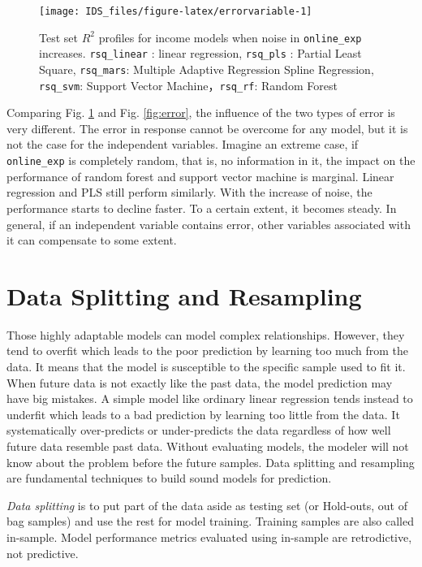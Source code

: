 \documentclass[12pt,]{krantz}
\theoremstyle{definition}
\theoremstyle{definition}
\theoremstyle{remark}
\begin{document}
\begin{figure}

{\centering \texttt{[image: IDS\_files/figure-latex/errorvariable-1]} 

}

\caption{Test set \(R^2\) profiles for income models when
noise in \texttt{online\_exp} increases. \texttt{rsq\_linear} : linear
regression, \texttt{rsq\_pls} : Partial Least Square,
\texttt{rsq\_mars}: Multiple Adaptive Regression Spline Regression,
\texttt{rsq\_svm}: Support Vector Machine，\texttt{rsq\_rf}: Random
Forest}\label{fig:errorvariable}
\end{figure}

Comparing Fig. \ref{fig:errorvariable} and Fig. \ref{fig:error}, the
influence of the two types of error is very different. The error in
response cannot be overcome for any model, but it is not the case for
the independent variables. Imagine an extreme case, if
\texttt{online\_exp} is completely random, that is, no information in
it, the impact on the performance of random forest and support vector
machine is marginal. Linear regression and PLS still perform similarly.
With the increase of noise, the performance starts to decline faster. To
a certain extent, it becomes steady. In general, if an independent
variable contains error, other variables associated with it can
compensate to some extent.

\section{Data Splitting and
Resampling}\label{data-splitting-and-resampling}

Those highly adaptable models can model complex relationships. However,
they tend to overfit which leads to the poor prediction by learning too
much from the data. It means that the model is susceptible to the
specific sample used to fit it. When future data is not exactly like the
past data, the model prediction may have big mistakes. A simple model
like ordinary linear regression tends instead to underfit which leads to
a bad prediction by learning too little from the data. It systematically
over-predicts or under-predicts the data regardless of how well future
data resemble past data. Without evaluating models, the modeler will not
know about the problem before the future samples. Data splitting and
resampling are fundamental techniques to build sound models for
prediction.

\emph{Data splitting} is to put part of the data aside as testing set
(or Hold-outs, out of bag samples) and use the rest for model training.
Training samples are also called in-sample. Model performance metrics
evaluated using in-sample are retrodictive, not predictive.
\end{document}
